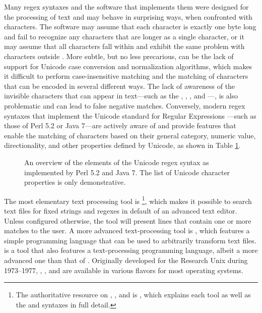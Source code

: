 \documentclass[
  a5paper,10pt,           %
  dvipsnames              %
]{book}
\begin{document}
Many regex syntaxes and the software that implements them were designed for the
processing of  text and may behave in surprising ways, when
confronted with  characters. The software may assume that each
character is exactly one byte long and fail to recognize any characters that are
longer as a single character, or it may assume that all  characters
fall within  and exhibit the same problem with characters outside
. More subtle, but no less precarious, can be the lack of support
for Unicode case conversion and normalization algorithms, which makes it
difficult to perform case-insensitive matching and the matching of characters
that can be encoded in several different ways. The lack of awareness of the
invisible characters that can appear in  text---such as the
, , , and ---, is also problematic
and can lead to false negative matches. Conversely, modern regex syntaxes that
implement the Unicode standard for Regular Expressions \cite{unicode13}---such
as those of Perl 5.2 or Java 7---are actively aware of  and provide
features that enable the matching of characters based on their general category,
numeric value, directionality, and other properties defined by Unicode, as shown
in Table \ref{tab:unicode-regexs}.

\begin{figure}
  
  \caption{An overview of the elements of the Unicode regex syntax as
    implemented by Perl 5.2 and Java 7. The list of Unicode character properties
    is only demonstrative.}
  \label{tab:unicode-regexs}
\end{figure}

The most elementary text processing  tool is %
\footnote{
  The authoritative resource on , , and 
  is , which explains each tool as well as the
   and  syntaxes in full detail.
}, which makes it possible to search text files for fixed strings and regexes in
default of an advanced text editor. Unless configured otherwise, the tool will
present lines that contain one or more matches to the user. A more advanced
text-processing  tool is , which features a simple
programming language that can be used to arbitrarily transform text files.
 is a  tool that also features a text-processing
programming language, albeit a more advanced one than that of .
Originally developed for the Research Unix during 1973--1977, ,
, and  are available in various flavors for most
operating systems.
\end{document}

